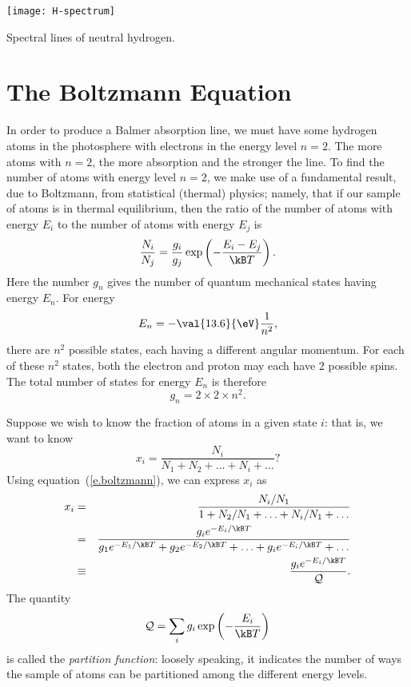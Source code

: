 \begin{marginfigure}[-8\baselineskip]
\texttt{[image: H-spectrum]}
\caption{Spectral lines of neutral hydrogen. 
\label{f.H-spectrum}}
\end{marginfigure}

\section{The Boltzmann Equation}
\label{s.boltzmann-eqn}

In order to produce a Balmer absorption line, we must have some hydrogen atoms in the photosphere with electrons in the energy level $n=2$. The more atoms with $n=2$, the more absorption and the stronger the line. To find the number of atoms with energy level $n=2$, we make use of a fundamental result, due to Boltzmann, from statistical (thermal) physics; namely, that if our sample of atoms is in thermal equilibrium, then the ratio of the number of atoms with energy $E_{i}$ to the number of atoms with energy $E_{j}$ is
\begin{equation}\label{e.boltzmann}
\frac{N_{i}}{N_{j}} = \frac{g_{i}}{g_{j}} 
\exp\left(-\frac{E_{i}-E_{j}}{\kB T}\right).
\end{equation}
Here the number $g_{n}$ gives the number of quantum mechanical states having energy $E_{n}$. For energy
\[
	E_{n} = -\val{13.6}{\eV}\frac{1}{n^{2}},
\]
there are $n^{2}$ possible states, each having a different angular momentum. For each of these $n^{2}$ states, both the electron and proton may each have 2 possible spins. The total number of states for energy $E_{n}$ is therefore
\[
	g_{n} = 2\times2\times n^{2}.
\]

Suppose we wish to know the fraction of atoms in a given state $i$: that is, we want to know
\[	x_{i} = \frac{N_{i}}{N_{1}+N_{2}+\ldots+N_{i}+\ldots} ? \]
Using equation~(\ref{e.boltzmann}), we can express $x_{i}$ as 
\begin{eqnarray}
  x_{i} &=& \frac{N_{i}/N_{1}}{1+N_{2}/N_{1}+\ldots+N_{i}/N_{1}+\ldots}\nonumber\\
        &=& \frac{g_{i}e^{-E_{i}/\kB T}}{g_{1}e^{-E_{1}/\kB T}+g_{2}e^{-E_{2}/\kB T}+\ldots+g_{i}e^{-E_{i}/\kB T}+\ldots} \nonumber\\
        &\equiv& \frac{g_{i}e^{-E_{i}/\kB T}}{\pfcn}.
\end{eqnarray}
The quantity 
\[ \pfcn = \sum_{i} g_{i}\exp\left(-\frac{E_{i}}{\kB T}\right) \]
is called the \emph{partition function}: loosely speaking, it indicates the number of ways the sample of atoms can be partitioned among the different energy levels.

